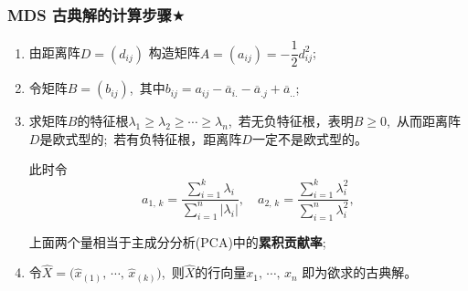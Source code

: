 \documentclass[UTF8, compress]{ctexbeamer}
\begin{document}
	\begin{frame}
	\frametitle{\heiti MDS 古典解的计算步骤$\bigstar$}
		\begin{enumerate}
			\item<2-| alert@2> 由距离阵$D=(d_{ij})$ 构造矩阵$A=(a_{ij})=-\dfrac12d_{ij}^2$;
			
			\item<3-| alert@3> 令矩阵$B=(b_{ij})$,\ 其中$b_{ij}=a_{ij}-\overline{a}_{i.}-\overline{a}_{.j}+\overline{a}_{..}$;
			
			\item<4-| alert@4>
			求矩阵$B$的特征根$\lambda_1\geqslant\lambda_2\geqslant\cdots\geqslant\lambda_n$,\ 若无负特征根，表明$B\geqslant 0$,\ 从而距离阵$D$是欧式型的;\ 若有负特征根，距离阵$D$一定不是欧式型的。
			
			此时令
			\begin{equation}
			a_{1,\,k}=
			\dfrac{\sum\limits_{i=1}^k\lambda_i}{\sum\limits_{i=1}^n|\lambda_i|},\quad
			a_{2,\,k}=
			\dfrac{\sum\limits_{i=1}^k\lambda_i^2}{\sum\limits_{i=1}^n\lambda_i^2},
			\end{equation}
			
			上面两个量相当于主成分分析(PCA)中的\textbf{累积贡献率};
			
			
			\item<7-| alert@7> 令$\hat{X}
			=\big(\hat{x}_{(1)},\,\cdots,\,\hat{x}_{(k)}\big)$,\ 则$\hat{X}$的行向量$x_1,\,\cdots,\,x_n$
			即为欲求的古典解。
		\end{enumerate}
	\end{frame}
	
\end{document}
